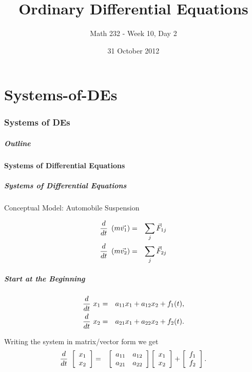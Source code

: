 \part{Systems-of-DEs}
\section{Systems of DEs}


\title{Ordinary Differential Equations}
\subtitle{Math 232 - Week 10, Day 2}
\date{31 October 2012}

\begin{frame}
  \titlepage
\end{frame}

\begin{frame}
  \frametitle{Outline}
\end{frame}


\subsection{Systems of Differential Equations}


\begin{frame}
  \frametitle{Systems of Differential Equations}

  Conceptual Model: Automobile Suspension

  \begin{eqnarray*}
    \deriv{~}{t} \lp m \vec{v_1} \rp & = & \sum_j \vec{F}_{1j} \\
    \deriv{~}{t} \lp m \vec{v_2} \rp & = & \sum_j \vec{F}_{2j} 
  \end{eqnarray*}

\end{frame}


\begin{frame}
  \frametitle{Start at the Beginning}

  \begin{eqnarray*}
    \deriv{~}{t} x_1  & = & a_{11} x_1 + a_{12} x_2 + f_1(t), \\
    \deriv{~}{t} x_2  & = & a_{21} x_1 + a_{22} x_2 + f_2(t).
  \end{eqnarray*}

  Writing the system in matrix/vector form we get
  \begin{eqnarray*}
    \deriv{~}{t} \vecTwo{x_1}{x_2} & = & 
    \arrayTwo{a_{11}}{a_{12}}{a_{21}}{a_{22}} \vecTwo{x_1}{x_2} + 
    \vecTwo{f_1}{f_2}.
  \end{eqnarray*}

\end{frame}



